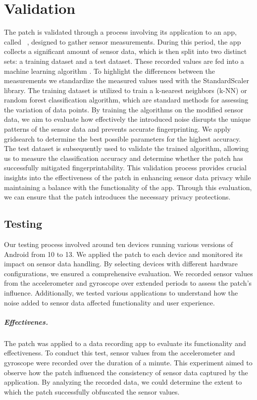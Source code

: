 \documentclass[11pt,
  oneside,openany,    %
]{scrreprt}
\begin{document}
\chapter{Validation}
\label{chap:validaton}
The patch is validated through a process involving its application to an app, called ~\cite{SensorBox}, designed to gather sensor measurements.
During this period, the app collects a significant amount of sensor data, which is then split into two distinct sets: a training dataset and a test dataset.
These recorded values are fed into a machine learning algorithm \cite{DBLP:conf/ndss/DasBC16}.
To highlight the differences between the measurements we standardize the measured values used with the StandardScaler library.
The training dataset is utilized to train a k-nearest neighbors (k-NN) or random forest classification algorithm, which are standard methods for assessing the variation of data points.
By training the algorithms on the modified sensor data, we aim to evaluate how effectively the introduced noise disrupts the unique patterns of the sensor data and prevents accurate fingerprinting.
We apply gridsearch to determine the best possible parameters for the highest accuracy.
The test dataset is subsequently used to validate the trained algorithm, allowing us to measure the classification accuracy and determine whether the patch has successfully mitigated fingerprintability.
This validation process provides crucial insights into the effectiveness of the patch in enhancing sensor data privacy while maintaining a balance with the functionality of the app.
Through this evaluation, we can ensure that the patch introduces the necessary privacy protections.

\section{Testing}
\label{sec:testing}
Our testing process involved around ten devices running various versions of Android from 10 to 13.
We applied the patch to each device and monitored its impact on sensor data handling.
By selecting devices with different hardware configurations, we ensured a comprehensive evaluation.
We recorded sensor values from the accelerometer and gyroscope over extended periods to assess the patch's influence.
Additionally, we tested various applications to understand how the noise added to sensor data affected functionality and user experience.

\paragraph{Effectivenes.}
\label{par:effectiveness}
The patch was applied to a data recording app \cite{SensorBox} to evaluate its functionality and effectiveness.
To conduct this test, sensor values from the accelerometer and gyroscope were recorded over the duration of a minute.
This experiment aimed to observe how the patch influenced the consistency of sensor data captured by the application.
By analyzing the recorded data, we could determine the extent to which the patch successfully obfuscated the sensor values.
\end{document}
